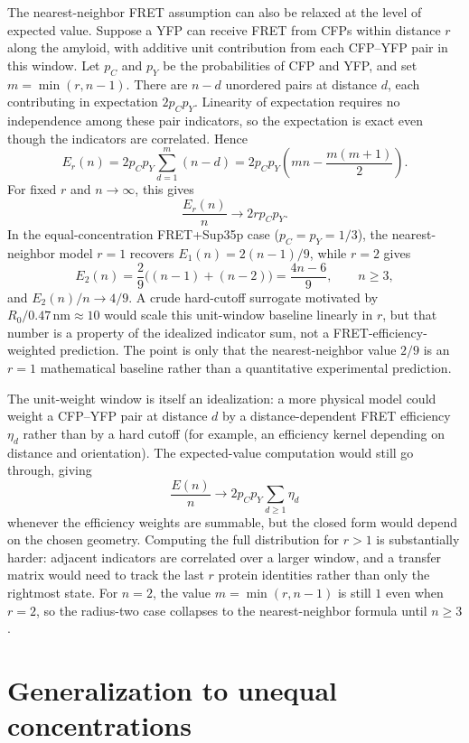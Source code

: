 \documentclass[11pt]{article}
\begin{document}
The nearest-neighbor FRET assumption can also be relaxed at the level of expected value. Suppose a YFP can receive FRET from CFPs within distance $r$ along the amyloid, with additive unit contribution from each CFP--YFP pair in this window. Let $p_C$ and $p_Y$ be the probabilities of CFP and YFP, and set $m=\min(r,n-1)$. There are $n-d$ unordered pairs at distance $d$, each contributing in expectation $2p_Cp_Y$. Linearity of expectation requires no independence among these pair indicators, so the expectation is exact even though the indicators are correlated. Hence
\[
E_r(n) = 2p_Cp_Y \sum_{d=1}^{m} (n-d)
= 2p_Cp_Y\left(mn-\frac{m(m+1)}{2}\right).
\]
For fixed $r$ and $n \to \infty$, this gives
\[
\frac{E_r(n)}{n} \longrightarrow 2r p_Cp_Y.
\]
In the equal-concentration FRET+Sup35p case ($p_C=p_Y=1/3$), the nearest-neighbor model $r=1$ recovers $E_1(n)=2(n-1)/9$, while $r=2$ gives
\[
E_2(n)=\frac{2}{9}\bigl((n-1)+(n-2)\bigr)=\frac{4n-6}{9}, \qquad n \ge 3,
\]
and $E_2(n)/n \to 4/9$. A crude hard-cutoff surrogate motivated by $R_0/0.47\,\text{nm} \approx 10$ would scale this unit-window baseline linearly in $r$, but that number is a property of the idealized indicator sum, not a FRET-efficiency-weighted prediction. The point is only that the nearest-neighbor value $2/9$ is an $r=1$ mathematical baseline rather than a quantitative experimental prediction.

The unit-weight window is itself an idealization: a more physical model could weight a CFP--YFP pair at distance $d$ by a distance-dependent FRET efficiency $\eta_d$ rather than by a hard cutoff (for example, an efficiency kernel depending on distance and orientation). The expected-value computation would still go through, giving
\[
\frac{E(n)}{n} \longrightarrow 2p_Cp_Y\sum_{d \ge 1} \eta_d
\]
whenever the efficiency weights are summable, but the closed form would depend on the chosen geometry. Computing the full distribution for $r>1$ is substantially harder: adjacent indicators are correlated over a larger window, and a transfer matrix would need to track the last $r$ protein identities rather than only the rightmost state.
For $n=2$, the value $m=\min(r,n-1)$ is still $1$ even when $r=2$, so the radius-two case collapses to the nearest-neighbor formula until $n \ge 3$.

\section{Generalization to unequal concentrations}\label{sec:unequal}
\end{document}
